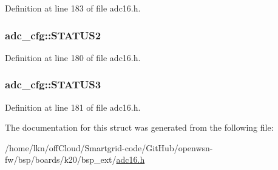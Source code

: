 Definition at line 183 of file adc16.\+h.

\subsubsection[{\texorpdfstring{S\+T\+A\+T\+U\+S2}{STATUS2}}]{ adc\+\_\+cfg\+::\+S\+T\+A\+T\+U\+S2}\hypertarget{structadc__cfg_afbc3fd30cb4d69b01da264f1cd08c346}{}\label{structadc__cfg_afbc3fd30cb4d69b01da264f1cd08c346}


Definition at line 180 of file adc16.\+h.

\subsubsection[{\texorpdfstring{S\+T\+A\+T\+U\+S3}{STATUS3}}]{ adc\+\_\+cfg\+::\+S\+T\+A\+T\+U\+S3}\hypertarget{structadc__cfg_a147712e3dd9d8cb5dfbbdebaa2a201db}{}\label{structadc__cfg_a147712e3dd9d8cb5dfbbdebaa2a201db}


Definition at line 181 of file adc16.\+h.



The documentation for this struct was generated from the following file\+:\begin{DoxyCompactItemize}
\item 
/home/lkn/off\+Cloud/\+Smartgrid-\/code/\+Git\+Hub/openwsn-\/fw/bsp/boards/k20/bsp\+\_\+ext/\hyperlink{adc16_8h}{adc16.\+h}\end{DoxyCompactItemize}
